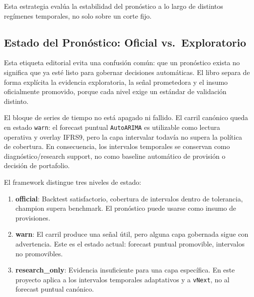 \documentclass[
  spanish,
  11pt,
  letterpaper,
]{scrbook}
\providecommand{\tightlist}{%
  \setlength{\itemsep}{0pt}\setlength{\parskip}{0pt}}
\theoremstyle{plain}
\theoremstyle{remark}
\begin{document}
Esta estrategia evalúa la estabilidad del pronóstico a lo largo de
distintos regímenes temporales, no solo sobre un corte fijo.

\subsection{Estado del Pronóstico: Oficial
vs.~Exploratorio}\label{estado-del-pronuxf3stico-oficial-vs.-exploratorio}

Esta etiqueta editorial evita una confusión común: que un pronóstico
exista no significa que ya esté listo para gobernar decisiones
automáticas. El libro separa de forma explícita la evidencia
exploratoria, la señal prometedora y el insumo oficialmente promovido,
porque cada nivel exige un estándar de validación distinto.

\begin{tcolorbox}[enhanced jigsaw, arc=.35mm, bottomrule=.15mm, bottomtitle=1mm, breakable, colback=white, colbacktitle=quarto-callout-warning-color!10!white, colframe=quarto-callout-warning-color-frame, coltitle=black, left=2mm, leftrule=.75mm, opacityback=0, opacitybacktitle=0.6, rightrule=.15mm, title=\textcolor{quarto-callout-warning-color}{\faExclamationTriangle}\hspace{0.5em}{Status: warn; intervalos research\_only}, titlerule=0mm, toprule=.15mm, toptitle=1mm]

El bloque de series de tiempo no está apagado ni fallido. El carril
canónico queda en estado \texttt{warn}: el forecast puntual
\texttt{AutoARIMA} es utilizable como lectura operativa y overlay IFRS9,
pero la capa intervalar todavía no supera la política de cobertura. En
consecuencia, los intervalos temporales se conservan como
diagnóstico/research support, no como baseline automático de provisión o
decisión de portafolio.

\end{tcolorbox}

El framework distingue tres niveles de estado:

\begin{enumerate}
\def\labelenumi{\arabic{enumi}.}
\tightlist
\item
  \textbf{official}: Backtest satisfactorio, cobertura de intervalos
  dentro de tolerancia, champion supera benchmark. El pronóstico puede
  usarse como insumo de provisiones.
\item
  \textbf{warn}: El carril produce una señal útil, pero alguna capa
  gobernada sigue con advertencia. Este es el estado actual: forecast
  puntual promovible, intervalos no promovibles.
\item
  \textbf{research\_only}: Evidencia insuficiente para una capa
  específica. En este proyecto aplica a los intervalos temporales
  adaptativos y a \texttt{vNext}, no al forecast puntual canónico.
\end{enumerate}
\end{document}
